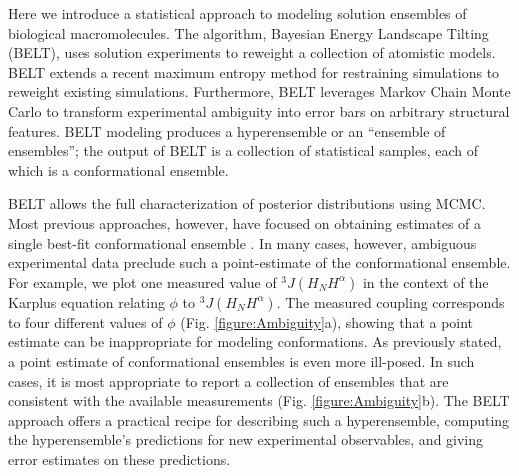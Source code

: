 \documentclass[11pt,titlepage]{article}
\begin{document}
Here we introduce a statistical approach to modeling solution ensembles of biological macromolecules.  The algorithm, Bayesian Energy Landscape Tilting (BELT), uses solution experiments to reweight a collection of atomistic models.  BELT extends a recent maximum entropy method for restraining simulations  \citep{chodera2012} to reweight existing simulations.  Furthermore, BELT leverages Markov Chain Monte Carlo \citep{patil2010pymc} to transform experimental ambiguity into error bars on arbitrary structural features.  BELT modeling produces a hyperensemble or an ``ensemble of ensembles''; the output of BELT is a collection of statistical samples, each of which is a conformational ensemble. 

BELT allows the full characterization of posterior distributions using MCMC.  Most previous approaches, however, have focused on obtaining estimates of a single best-fit conformational ensemble  \citep{rozycki2011saxs,  Graf2007}.  In many cases, however, ambiguous experimental data preclude such a point-estimate of the conformational ensemble.  For example, we plot one measured  \citep{Graf2007} value of $^3J(H_NH^\alpha)$ in the context of the Karplus \citep{vogeli2007limits} equation relating $\phi$ to $^3J(H_NH^\alpha)$.  The measured coupling corresponds to four different values of $\phi$ (Fig. \ref{figure:Ambiguity}a), showing that a point estimate can be inappropriate for modeling conformations.  As previously stated, a point estimate of conformational ensembles is even more ill-posed.  In such cases, it is most appropriate to report a collection of ensembles that are consistent with the available measurements (Fig. \ref{figure:Ambiguity}b).  The BELT approach offers a practical recipe for describing 
such a hyperensemble, computing the hyperensemble's predictions for new experimental observables, and giving error estimates on these predictions.
\end{document}
